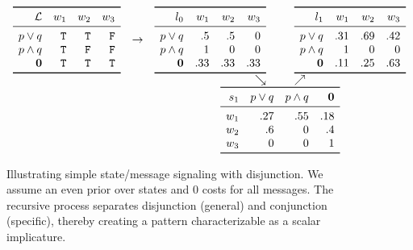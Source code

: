 \documentclass{article}
\begin{document}
\begin{figure}[htp]
  \centering
  \setlength{\arraycolsep}{3pt}  
  $\begin{array}[b]{c c r@{\hspace{25pt}}l}
     \begin{array}[c]{r *{3}{r}}
       \toprule
       \Lex        & w_{1} & w_{2} & w_{3} \\
       \midrule
       \porq    & \True & \True  & \False \\
       \pandq   & \True & \False & \False  \\
       \nullmsg & \True & \True  & \True \\
       \bottomrule
     \end{array}
   &
   \rightarrow
   &
   \begin{array}[c]{r *{3}{r}}
     \toprule
     \listenerZero & w_{1} & w_{2} & w_{3} \\
     \midrule
     \porq    & .5  &  .5  & 0 \\
     \pandq   & 1   &  0   & 0 \\
     \nullmsg & .33 & .33  & .33 \\
     \bottomrule
   \end{array}
   &
   \begin{array}[c]{r *{3}{r}}
     \toprule
     \listenerOne & w_{1} & w_{2} & w_{3} \\
     \midrule
     \porq    & .31 & .69 & .42 \\
     \pandq   & 1   &   0 &   0 \\
     \nullmsg & .11 & .25 & .63 \\
     \bottomrule
   \end{array}
   \\
   && \searrow & \nearrow
   \\
   &&
   \multicolumn{2}{c}{
     \begin{array}[c]{r *{4}{r}}
        \toprule
        \speakerOne & \porq & \pandq & \nullmsg \\
        \midrule
       w_{1} & .27 & .55 & .18 \\
       w_{2} & .6 &   0 & .4 \\ 
       w_{3} &   0 &   0 &  1 \\ 
       \bottomrule
      \end{array}
     }
   \end{array}$   
   \caption{Illustrating simple state/message signaling with
     disjunction.  We assume an even prior over states and $0$ costs
     for all messages. The recursive process separates disjunction
     (general) and conjunction (specific), thereby creating a pattern
     characterizable as a scalar implicature.}
  \label{fig:rsa-disj}
\end{figure}
\end{document}
